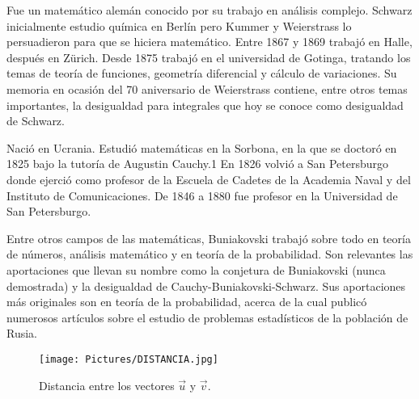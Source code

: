 \begin{parchment} {Fue un matemático alemán conocido por su trabajo en análisis complejo. Schwarz inicialmente estudio química en Berlín pero Kummer y Weierstrass lo persuadieron para que se hiciera matemático. Entre 1867 y 1869 trabajó en Halle, después en Zürich. Desde 1875 trabajó en el universidad de Gotinga, tratando los temas de teoría de funciones, geometría diferencial y cálculo de variaciones. Su memoria en ocasión del 70 aniversario de Weierstrass contiene, entre otros temas importantes, la desigualdad para integrales que hoy se conoce como desigualdad de Schwarz. \cite{schwarz} }
\end{parchment}




\bigskip




\begin{parchment}{ Nació en Ucrania. Estudió matemáticas en la Sorbona, en la que se doctoró en 1825 bajo la tutoría de Augustin Cauchy.1​
En 1826 volvió a San Petersburgo donde ejerció como profesor de la Escuela de Cadetes de la Academia Naval y del Instituto de Comunicaciones. De 1846 a 1880 fue profesor en la Universidad de San Petersburgo. 

Entre otros campos de las matemáticas, Buniakovski trabajó sobre todo en teoría de números, análisis matemático y en teoría de la probabilidad. Son relevantes las aportaciones que llevan su nombre como la conjetura de Buniakovski (nunca demostrada) y la desigualdad de Cauchy-Buniakovski-Schwarz. Sus aportaciones más originales son en teoría de la probabilidad, acerca de la cual publicó numerosos artículos sobre el estudio de problemas estadísticos de la población de Rusia. \cite{buny}   } 
\end{parchment}


\bigskip

\bigskip






\begin{figure}
    \centering
    \texttt{[image: Pictures/DISTANCIA.jpg]}
    \caption{Distancia entre los vectores $\vec{u}$ y $\vec{v}$. }
    \label{DISTANCIA}
\end{figure}

\bigskip

